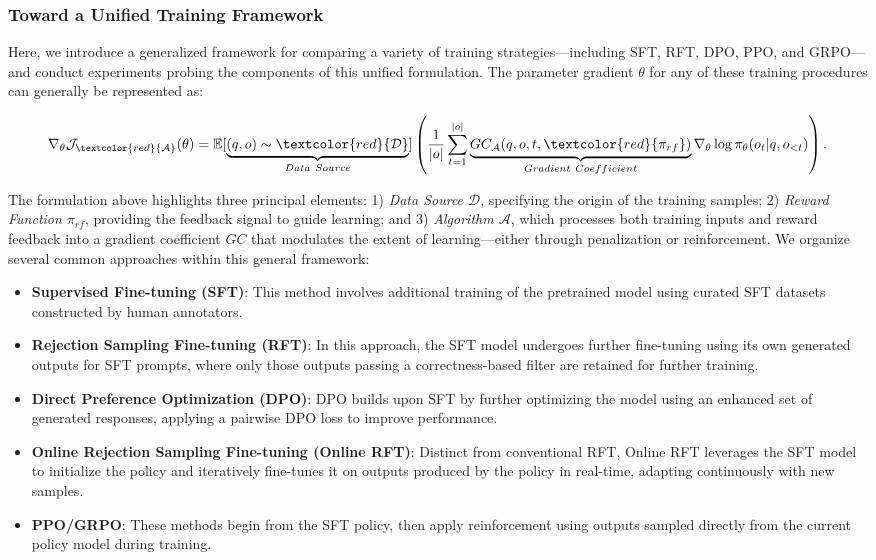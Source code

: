 \subsubsection{Toward a Unified Training Framework} Here, we introduce a generalized framework for comparing a variety of training strategies—including SFT, RFT, DPO, PPO, and GRPO—and conduct experiments probing the components of this unified formulation. The parameter gradient $\theta$ for any of these training procedures can generally be represented as:

\begin{equation}
    \nabla_{\theta}\mathcal{J}_{\textcolor{red}{\mathcal{A}}}(\theta) = \mathbb{E}[\underbrace{(q,o) \sim \textcolor{red}{\mathcal{D}}}_{Data \ Source}]\left( \frac{1}{|o|} \sum_{t=1}^{|o|}  \underbrace{GC_{{\mathcal{A}}}(q, o, t, \textcolor{red}{\pi_{{rf}}})}_{Gradient \ Coefficient}  \nabla_{\theta}\log \pi_{\theta}(o_t | q, o_{<t})\right).
\label{eq:objective}
\end{equation}

The formulation above highlights three principal elements: 1) \textit{Data Source $\mathcal{D}$}, specifying the origin of the training samples; 2) \textit{Reward Function $\pi_{{rf}}$}, providing the feedback signal to guide learning; and 3) \textit{Algorithm $\mathcal{A}$}, which processes both training inputs and reward feedback into a gradient coefficient $GC$ that modulates the extent of learning—either through penalization or reinforcement. We organize several common approaches within this general framework:

\begin{itemize}
    \item  \textbf{Supervised Fine-tuning (SFT)}: This method involves additional training of the pretrained model using curated SFT datasets constructed by human annotators.
    \item \textbf{Rejection Sampling Fine-tuning (RFT)}: In this approach, the SFT model undergoes further fine-tuning using its own generated outputs for SFT prompts, where only those outputs passing a correctness-based filter are retained for further training.
    \item \textbf{Direct Preference Optimization (DPO)}: DPO builds upon SFT by further optimizing the model using an enhanced set of generated responses, applying a pairwise DPO loss to improve performance.
    \item \textbf{Online Rejection Sampling Fine-tuning (Online RFT)}: Distinct from conventional RFT, Online RFT leverages the SFT model to initialize the policy and iteratively fine-tunes it on outputs produced by the policy in real-time, adapting continuously with new samples.
    \item \textbf{PPO/GRPO}: These methods begin from the SFT policy, then apply reinforcement using outputs sampled directly from the current policy model during training.
\end{itemize}

